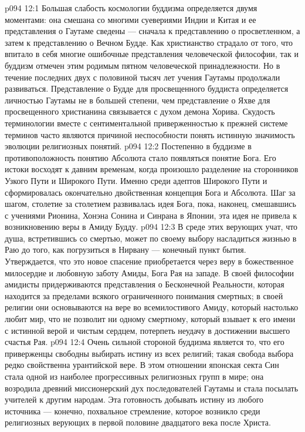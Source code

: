 \vs p094 12:1 Большая слабость космологии буддизма определяется двумя моментами: она смешана со многими суевериями Индии и Китая и ее представления о Гаутаме сведены --- сначала к представлению о просветленном, а затем к представлению о Вечном Будде. Как христианство страдало от того, что впитало в себя многие ошибочные представления человеческой философии, так и буддизм отмечен этим родимым пятном человеческой принадлежности. Но в течение последних двух с половиной тысяч лет учения Гаутамы продолжали развиваться. Представление о Будде для просвещенного буддиста определяется личностью Гаутамы не в большей степени, чем представление о Яхве для просвещенного христианина связывается с духом демона Хорива. Скудость терминологии вместе с сентиментальной приверженностью к прежней системе терминов часто являются причиной неспособности понять истинную значимость эволюции религиозных понятий.
\vs p094 12:2 \pc Постепенно в буддизме в противоположность понятию Абсолюта стало появляться понятие Бога. Его истоки восходят к давним временам, когда произошло разделение на сторонников Узкого Пути и Широкого Пути. Именно среди адептов Широкого Пути и сформировалась окончательно двойственная концепция Бога и Абсолюта. Шаг за шагом, столетие за столетием развивалась идея Бога, пока, наконец, смешавшись с учениями Рионина, Хонэна Сонина и Синрана в Японии, эта идея не привела к возникновению веры в Амиду Будду.
\vs p094 12:3 В среде этих верующих учат, что душа, встретившись со смертью, может по своему выбору насладиться жизнью в Раю до того, как погрузиться в Нирвану --- конечный пункт бытия. Утверждается, что это новое спасение приобретается через веру в божественное милосердие и любовную заботу Амиды, Бога Рая на западе. В своей философии амидисты придерживаются представления о Бесконечной Реальности, которая находится за пределами всякого ограниченного понимания смертных; в своей религии они основываются на вере во всемилостивого Амиду, который настолько любит мир, что не позволит ни одному смертному, который взывает к его имени с истинной верой и чистым сердцем, потерпеть неудачу в достижении высшего счастья Рая.
\vs p094 12:4 Очень сильной стороной буддизма является то, что его приверженцы свободны выбирать истину из всех религий; такая свобода выбора редко свойственна урантийской вере. В этом отношении японская секта Син стала одной из наиболее прогрессивных религиозных групп в мире; она возродила древний миссионерский дух последователей Гаутамы и стала посылать учителей к другим народам. Эта готовность добывать истину из любого источника --- конечно, похвальное стремление, которое возникло среди религиозных верующих в первой половине двадцатого века после Христа.
